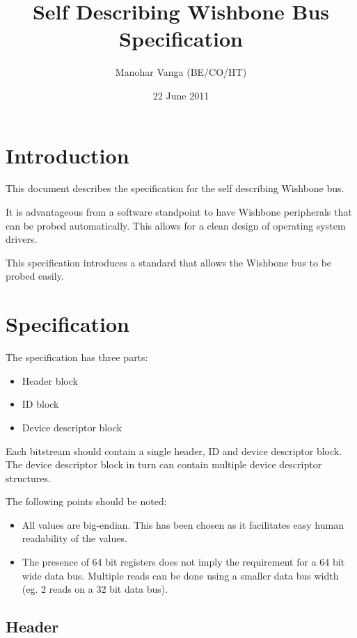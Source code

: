 \documentclass{article}
\title{Self Describing Wishbone Bus Specification}
\author{Manohar Vanga (BE/CO/HT)}
\date{22 June 2011}
\begin{document}
\maketitle

\tableofcontents
\listoftables
\listoffigures

\pagebreak

\section{Introduction}

This document describes the specification for the self describing Wishbone
bus.

It is advantageous from a software standpoint to have Wishbone peripherals
that can be probed automatically. This allows for a clean design of operating
system drivers.

This specification introduces a standard that allows the Wishbone bus to be
probed easily.

\pagebreak

\section{Specification}

The specification has three parts:

\begin{itemize}
\item Header block
\item ID block
\item Device descriptor block
\end{itemize}

Each bitstream should contain a single header, ID and device descriptor
block. The device descriptor block in turn can contain multiple device
descriptor structures.

The following points should be noted:

\begin{itemize}
\item All values are big-endian. This has been chosen as it facilitates easy
human readability of the values.
\item The presence of 64 bit registers does not imply the requirement for a
64 bit wide data bus. Multiple reads can be done using a smaller data
bus width (eg. 2 reads on a 32 bit data bus).
\end{itemize}

\subsection{Header}
\end{document}
